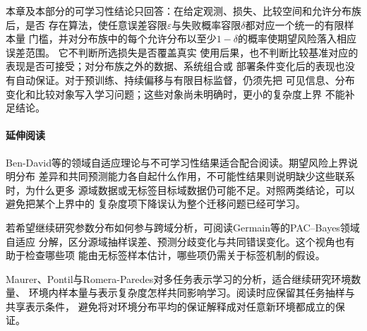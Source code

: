本章及本部分的可学习性结论只回答：在给定观测、损失、比较空间和允许分布族后，是否
存在算法，使任意误差容限$\varepsilon$与失败概率容限$\delta$都对应一个统一的有限样本量
门槛，并对分布族中的每个允许分布以至少$1-\delta$的概率使期望风险落入相应误差范围。
它不判断所选损失是否覆盖真实
使用后果，也不判断比较基准对应的表现是否可接受；对分布族之外的数据、系统组合或
部署条件变化后的表现也没有自动保证。对于预训练、持续偏移与有限目标监督，仍须先把
可见信息、分布变化和比较对象写入学习问题；这些对象尚未明确时，更小的复杂度上界
不能补足结论。

\paragraph{延伸阅读}
Ben-David等的领域自适应理论与不可学习性结果适合配合阅读。期望风险上界说明分布
差异和共同预测能力各自起什么作用，不可能性结果则说明缺少这些联系时，为什么更多
源域数据或无标签目标域数据仍可能不足。对照两类结论，可以避免把某个上界中的
复杂度项下降误认为整个迁移问题已经可学习。

若希望继续研究参数分布如何参与跨域分析，可阅读Germain等的PAC--Bayes领域自适应
分解，区分源域抽样误差、预测分歧变化与共同错误变化。这个视角也有助于检查哪些项
能由无标签样本估计，哪些项仍需关于标签机制的假设。

Maurer、Pontil与Romera-Paredes对多任务表示学习的分析，适合继续研究环境数量、
环境内样本量与表示复杂度怎样共同影响学习。阅读时应保留其任务抽样与共享表示条件，
避免将对环境分布平均的保证解释成对任意新环境都成立的保证。
